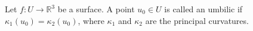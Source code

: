 Let $f: U \to \mathbb{R}^3$ be a surface. A point $u_0 \in U$ is called an umbilic if $\kappa_1(u_0) = \kappa_2(u_0)$, where $\kappa_1$ and $\kappa_2$ are the principal curvatures.
